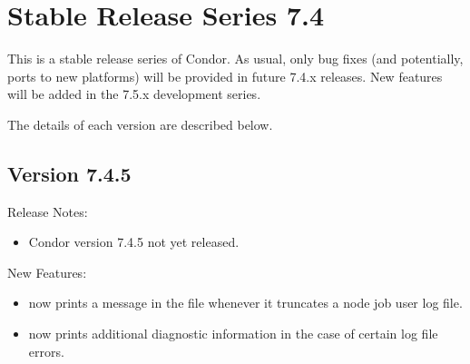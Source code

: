 
\section{\label{sec:History-7-4}Stable Release Series 7.4}

This is a stable release series of Condor.
As usual, only bug fixes (and potentially, ports to new platforms)
will be provided in future 7.4.x releases.
New features will be added in the 7.5.x development series.

The details of each version are described below.

\subsection*{\label{sec:New-7-4-5}Version 7.4.5}

\noindent Release Notes:

\begin{itemize}

\item Condor version 7.4.5 not yet released.

\end{itemize}


\noindent New Features:

\begin{itemize}

\item {} now prints a message in the  file
whenever it truncates a node job user log file.

\item {} now prints additional diagnostic information in the
case of certain log file errors.

\end{itemize}

